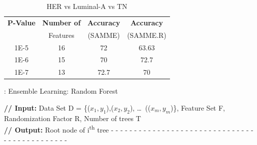 \documentclass[10pt,journal,compsoc]{IEEEtran}
\begin{document}
\begin{table}[!b]
\scriptsize
\centering
\caption{HER vs Luminal-A vs TN}
\label{tb7}
\begin{tabular}{| c | c | c | c |}
\hline
\textbf{P-Value} & \textbf{Number of} & \textbf{Accuracy} & \textbf{Accuracy}\\
&Features&(SAMME)&(SAMME.R)\\
\hline
1E-5&16&72&63.63\\
\hline
1E-6&15&70&72.7\\
\hline
1E-7&13&72.7&70\\
\hline
\end{tabular}
\end{table}

\begin{algorithm}[!t]
\caption{: Ensemble Learning: Random Forest}\label{alg:rf}
\begin{algorithmic}[1]
\footnotesize
\STATE \textbf{// Input:} Data Set D = \{(\(x_1, y_1\)),(\(x_2, y_2\)), \dots\, ((\(x_m, y_m\))\}, Feature Set F, Randomization Factor R, Number of trees T 
\\\textbf{// Output:} Root node of i\textsuperscript{th} tree
\STATE - - - - - - - - - - - - - - - - - - - - - - - - - - - - - - - - - - - - - - - - - - - - -
\ENDIF
{}  
\ENDFOR
\ENDFOR
{}
\end{algorithmic}
\end{algorithm}
\end{document}

